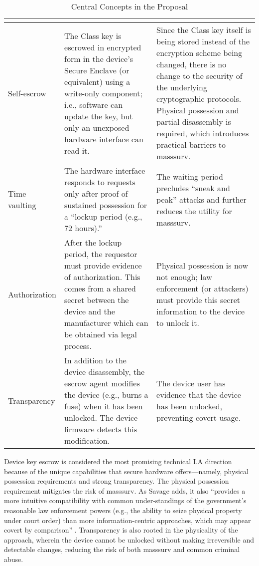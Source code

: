 \documentclass[manuscript,screen,review]{acmart}
\renewcommand*{\thead}[1]{\multicolumn{1}{c}{\bfseries \makecell{#1}}}
\begin{document}
\begin{table}[h]
  \caption{Central Concepts in the \ldawmsr Proposal}
  \label{table-ldawmsr-concepts}
  \FlushLeft
  \small
  \begin{tabular}{ |l|p{6.4cm}|p{6.4cm}| }
    \hline
    \thead{Concept} & \thead{Implementation} & \thead{Outcome} \\ \hline
    Self-escrow
    & The Class key is escrowed in encrypted form in the device's Secure Enclave (or equivalent) using a write-only
      component; i.e., software can update the key, but only an unexposed hardware interface can read it.
    & Since the Class key itself is being stored instead of the encryption scheme being changed, there is no change to
      the security of the underlying cryptographic protocols. Physical possession and partial disassembly is required,
      which introduces practical barriers to \ac{masssurv}.
    \\ \hline
    Time vaulting
    & The hardware interface responds to requests only after proof of sustained possession for a ``lockup period (e.g.,
      72 hours).''
    & The waiting period precludes ``sneak and peak'' attacks and further reduces the utility for \ac{masssurv}.
    \\ \hline
    Authorization
    & After the lockup period, the requestor must provide evidence of authorization. This comes from a shared secret
      between the device and the manufacturer which can be obtained via legal process.
    & Physical possession is now not enough; law enforcement (or attackers) must provide this secret information to the
      device to unlock it.
    \\ \hline
    Transparency
    & In addition to the device disassembly, the escrow agent modifies the device (e.g., burns a fuse) when it has been
      unlocked. The device firmware detects this modification.
    & The device user has evidence that the device has been unlocked, preventing covert usage.
    \\ \hline
  \end{tabular}
\end{table}

Device key escrow is considered the most promising technical \ac{LA} direction because of the unique capabilities that
secure hardware offers---namely, physical possession requirements and strong transparency. The physical possession
requirement mitigates the risk of \ac{masssurv}. As Savage adds, it also ``provides a more intuitive compatibility with
common under-standings of the government’s reasonable law enforcement powers (e.g., the ability to seize physical
property under court order) than more information-centric approaches, which may appear covert by comparison''
\cite{savage_lawful_2018}. Transparency is also rooted in the physicality of the approach, wherein the device cannot be
unlocked without making irreversible and detectable changes, reducing the risk of both \ac{masssurv} and common criminal
abuse.
\end{document}
